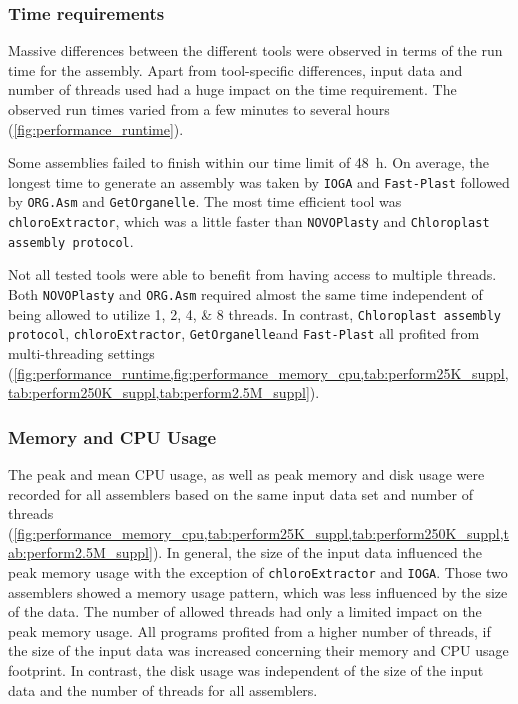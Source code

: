 \documentclass{bmcart}
\newcommand{\todo}[1]{\textcolor{red}{\bfseries(ToDO: #1})}
\newcommand{\formatprogramnames}[1]{\texttt{#1}}
\newcommand{\ce}{\formatprogramnames{chloroExtractor}}
\newcommand{\oa}{\formatprogramnames{ORG.Asm}}
\newcommand{\fp}{\formatprogramnames{Fast-Plast}}
\newcommand{\ioga}{\formatprogramnames{IOGA}}
\newcommand{\np}{\formatprogramnames{NOVOPlasty}}
\newcommand{\go}{\formatprogramnames{GetOrganelle}}
\newcommand{\cassp}{\formatprogramnames{Chloroplast assembly protocol}}
\begin{document}
\subsubsection*{Time requirements}
Massive differences between the different tools were observed in terms of the run time for the assembly. Apart from tool-specific differences, input data and number of threads used had a huge impact on the time requirement. The observed run times varied from a few minutes to several hours (\cref{fig:performance_runtime}).

Some assemblies failed to finish within our time limit of \SI{48}{\hour}. 
On average, the longest time to generate an assembly was taken by \ioga{} and \fp{} followed by \oa{} and \go{}.
The most time efficient tool was \ce{}, which was a little faster than \np{} and \cassp{}.

Not all tested tools were able to benefit from having access to multiple threads.
Both \np{} and \oa{} required almost the same time independent of being allowed to utilize \numlist[list-final-separator={, or }]{1;2;4;8} threads.
In contrast, \cassp{}, \ce{}, \go  and \fp{} all profited from multi-threading settings  (\cref{fig:performance_runtime,fig:performance_memory_cpu,tab:perform25K_suppl,tab:perform250K_suppl,tab:perform2.5M_suppl}).

\subsubsection*{Memory and CPU Usage }
The peak and mean CPU usage, as well as peak memory and disk usage were recorded for all assemblers based on the same input data set and number of threads  (\cref{fig:performance_memory_cpu,tab:perform25K_suppl,tab:perform250K_suppl,tab:perform2.5M_suppl}).
In general, the size of the input data influenced the peak memory usage with the exception of \ce{} and \ioga{}.
Those two assemblers showed a memory usage pattern, which was less influenced by the size of the data.
The number of allowed threads had only a limited impact on the peak memory usage.
All programs profited from a higher number of threads, if the size of the input data was increased concerning their memory and CPU usage footprint.
In contrast, the disk usage was independent of the size of the input data and the number of threads for all assemblers.

\end{document}
